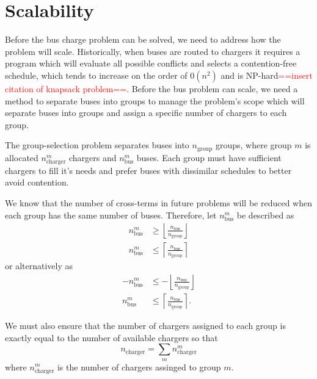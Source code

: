 \section{Scalability\label{sec:scalability}}
Before the bus charge problem can be solved, we need to address how the problem will scale. Historically, when buses are routed to chargers it requires a program which will evaluate all possible conflicts and selects a contention-free schedule, which tends to increase on the order of $0(n^2)$ and is NP-hard\textcolor{red}{==insert citation of knapsack problem==}. Before the bus problem can scale, we need a method to separate buses into groups to manage the problem's scope which will separate buses into groups and assign a specific number of chargers to each group.
\par The group-selection problem separates buses into $n_{\text{group}}$ groups, where group $m$ is allocated $n^m_{\text{charger}}$ chargers and $n^m_{\text{bus}}$ buses. Each group must have sufficient chargers to fill it's needs and prefer buses with dissimilar schedules to better avoid contention. 
\par We know that the number of cross-terms in future problems will be reduced when each group has the same number of buses. Therefore, let $n^m_{\text{bus}}$ be described as
\begin{equation*}\begin{aligned}
	n^m_{\text{bus}} &\ge \left \lfloor \frac{n_{\text{bus}}}{n_{\text{group}}} \right \rfloor \\
	n^m_{\text{bus}} &\le \left \lceil \frac{n_{\text{bus}}}{n_{\text{group}}} \right \rceil
\end{aligned}\end{equation*}
or alternatively as 
\begin{equation}\begin{aligned}
	-n^m_{\text{bus}} &\le -\left \lfloor \frac{n_{\text{bus}}}{n_{\text{group}}} \right \rfloor \\
	n^m_{\text{bus}} &\le \left \lceil \frac{n_{\text{bus}}}{n_{\text{group}}} \right \rceil.
\end{aligned}\end{equation}
\par We must also ensure that the number of chargers assigned to each group is exactly equal to the number of available chargers so that
\begin{equation}
	n_{\text{charger}} = \sum_mn_{\text{charger}}^m
\end{equation}
where $n_{\text{charger}}^m$ is the number of chargers assinged to group $m$.
